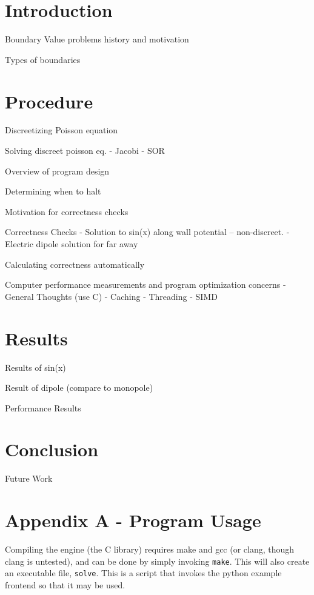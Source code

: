 \documentclass[12pt]{article}
\begin{document}
\section{Introduction}

Boundary Value problems history and motivation

Types of boundaries

\section{Procedure}

Discreetizing Poisson equation

Solving discreet poisson eq.
 - Jacobi
 - SOR

Overview of program design

Determining when to halt

Motivation for correctness checks

Correctness Checks
 - Solution to sin(x) along wall potential -- non-discreet.
 - Electric dipole solution for far away

Calculating correctness automatically

Computer performance measurements and program optimization concerns
 - General Thoughts (use C)
 - Caching
 - Threading
 - SIMD

\section{Results}

Results of sin(x)

Result of dipole (compare to monopole)

Performance Results

\section{Conclusion}

Future Work



\clearpage
\section{Appendix A - Program Usage}

Compiling the engine (the C library) requires make and gcc (or clang, though clang is untested), and can
be done by simply invoking \texttt{make}. This will also create an executable file, \texttt{solve}. This
is a script that invokes the python example frontend so that it may be used.
\end{document}
